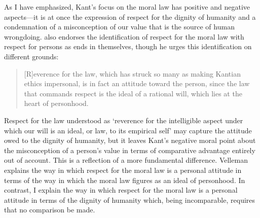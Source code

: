 \documentclass[a4paper,12pt]{article}
\begin{document}
% 

As I have emphasized, Kant's focus on the moral law has positive and negative aspects---it is at once the expression of respect for the dignity of humanity and a condemnation of a misconception of our value that is the source of human wrongdoing. \citet{Velleman:2006nx} also endorses the identification of respect for the moral law with respect for persons as ends in themselves, though he urges this identification on different grounds:
\begin{quote}
	[R]everence for the law, which has struck so many as making Kantian ethics impersonal, is in fact an attitude toward the person, since the law that commands respect is the ideal of a rational will, which lies at the heart of personhood. \citep[81]{Velleman:2006nx}
\end{quote}
Respect for the law understood as `reverence for the intelligible aspect under which our will is an ideal, or law, to its empirical self' \citep[80]{Velleman:2006nx} may capture the attitude owed to the dignity of humanity, but it leaves Kant's negative moral point about the misconception of a person's value in terms of comparative advantage entirely out of account. This is a reflection of a more fundamental difference. Velleman explains the way in which respect for the moral law is a personal attitude in terms of the way in which the moral law figures as an ideal of personhood. In contrast, I explain the way in which respect for the moral law is a personal attitude in terms of the dignity of humanity which, being incomparable, requires that no comparison be made.
\end{document}
